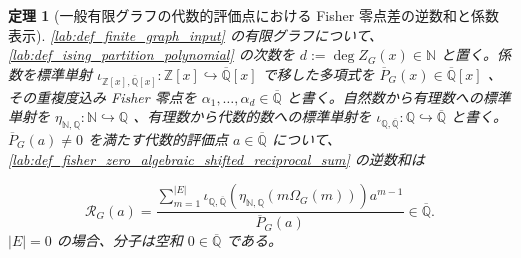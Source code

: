 \documentclass[11pt,a4paper]{article}
\newtheorem{theorem}[definition]{定理}
\theoremstyle{remark}
\begin{document}
\begin{theorem}[一般有限グラフの代数的評価点における Fisher 零点差の逆数和と係数表示]\label{lab:theorem_fisher_zero_algebraic_shifted_reciprocal_sum_coefficient_ratio}
\cref{lab:def_finite_graph_input}
 の有限グラフについて、
\cref{lab:def_ising_partition_polynomial}
 の次数を
$d:=\deg Z_G(x)\in\mathbb N$
 と置く。係数を標準単射
$\iota_{\mathbb Z[x],\overline{\mathbb Q}[x]}:\mathbb Z[x]\hookrightarrow\overline{\mathbb Q}[x]$
 で移した多項式を
$\overline P_G(x)\in\overline{\mathbb Q}[x]$
、その重複度込み Fisher 零点を
$\alpha_1,\ldots,\alpha_d\in\overline{\mathbb Q}$
 と書く。自然数から有理数への標準単射を
$\eta_{\mathbb N,\mathbb Q}:\mathbb N\hookrightarrow\mathbb Q$
、有理数から代数的数への標準単射を
$\iota_{\mathbb Q,\overline{\mathbb Q}}:\mathbb Q\hookrightarrow\overline{\mathbb Q}$
 と書く。
$\overline P_G(a)\ne0$
 を満たす代数的評価点
$a\in\overline{\mathbb Q}$
 について、
\cref{lab:def_fisher_zero_algebraic_shifted_reciprocal_sum}
 の逆数和は

\[\mathcal R_G(a)
=
\frac{
  \displaystyle
  \sum_{m=1}^{|E|}
  \iota_{\mathbb Q,\overline{\mathbb Q}}\!\left(
    \eta_{\mathbb N,\mathbb Q}\!\left(m\Omega_G(m)\right)
  \right)
  a^{m-1}
}{
  \overline P_G(a)
}
\in\overline{\mathbb Q}.\]
$|E|=0$
 の場合、分子は空和
$0\in\overline{\mathbb Q}$
 である。

\end{theorem}
\end{document}
